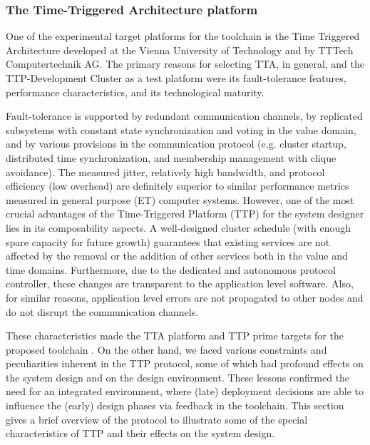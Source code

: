 \subsubsection{The Time-Triggered Architecture platform}

One of the experimental target platforms for the toolchain is the
Time Triggered Architecture \cite{kopetz:2001-22} developed at the
Vienna University of Technology and by TTTech Computertechnik AG.
The primary reasons for selecting TTA, in general, and the
TTP-Development Cluster as a test platform were its fault-tolerance features, performance characteristics, and its technological maturity.

Fault-tolerance is supported by redundant communication channels, by
replicated subsystems with constant state synchronization and
voting in the value domain, and by various provisions in the
communication protocol (e.g. cluster startup, distributed time
synchronization, and membership management with clique avoidance). The
measured jitter, relatively high bandwidth, and protocol efficiency (low overhead)
are definitely superior to
similar performance metrics measured in general purpose (ET)
computer systems. However, one of the most crucial advantages of the Time-Triggered Platform (TTP)
for the system designer lies in its composability aspects. A
well-designed cluster schedule (with enough spare capacity for
future growth) guarantees that existing services are not affected by
the removal or the addition of other services both in the value and time domains. Furthermore, due to the dedicated and
autonomous protocol controller, these changes are transparent to the
application level software. Also, for similar reasons, application
level errors are not propagated to other nodes and do not disrupt
the communication channels.

These characteristics made the TTA platform and TTP prime targets for the proposed toolchain . On the other
hand, we faced various constraints and peculiarities inherent
in the TTP protocol, some of which had profound effects on the system
design and on the design environment. These lessons confirmed the need for an integrated environment,
where (late) deployment decisions are able to influence the (early)
design phases via feedback in the toolchain. This section gives a
brief overview of the protocol to illustrate some of the special
characteristics of TTP and their effects on the system
design.


